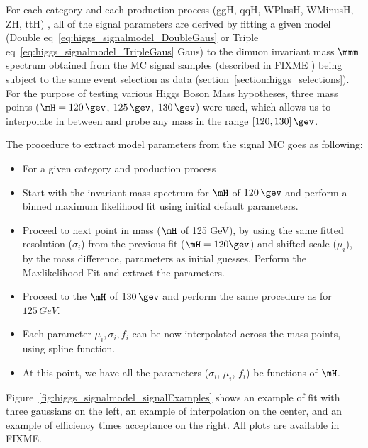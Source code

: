 %
%
For each category and each production process (ggH, qqH, WPlusH, WMinusH, ZH, ttH) , all of the signal parameters are derived by fitting a given model (Double eq~\ref{eq:higgs_signalmodel_DoubleGaus} or Triple eq~\ref{eq:higgs_signalmodel_TripleGaus} Gaus) to the dimuon invariant mass $\mmm$ spectrum obtained from the MC signal samples (described in FIXME %
) being subject to the same event selection as data (section~\ref{section:higgs_selections}).
For the purpose of testing various Higgs Boson Mass hypotheses, three mass points ($\mH=120\,\gev$, $125\,\gev$, $130\,\gev$) were used, which allows us to interpolate in between and probe any mass in the range $[120, 130]\,\gev$.

The procedure to extract model parameters from the signal MC goes as following:
\begin{itemize}
    \item For a given category and production process
    \item Start with the invariant mass spectrum for $\mH$ of $120\,\gev$ and perform a binned maximum likelihood fit using initial default parameters.
    \item Proceed to next point in mass ($\mH$ of 125 GeV), by using the same fitted resolution ($\sigma_{i}$) from the previous fit ($\mH= 120\gev$) and shifted scale ($\mu_{i}$), by the mass difference, parameters as initial guesses.
        Perform the Maxlikelihood Fit and extract the parameters.
    \item Proceed to the $\mH$ of $130\,\gev$ and perform the same procedure as for $125\,GeV$.
    \item Each parameter $\mu_{i}, \sigma_{i}, f_{i}$ can be now interpolated across the mass points, using spline function.
    \item At this point, we have all the parameters ($\sigma_{i}$, $\mu_{i}$, $f_{i}$) be functions of $\mH$.
\end{itemize}

Figure~\ref{fig:higgs_signalmodel_signalExamples} shows an example of fit with three gaussians on the left, an example of interpolation on the center, and an example of efficiency times acceptance on the right. All plots are available in FIXME.

